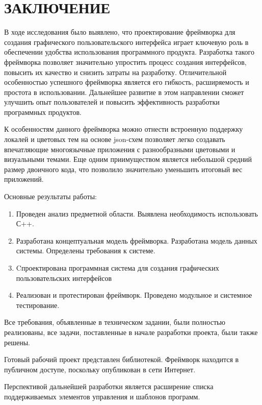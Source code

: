 \section*{ЗАКЛЮЧЕНИЕ}

В ходе исследования было выявлено, что проектирование фреймворка для создания графического пользовательского интерфейса играет ключевую роль в обеспечении удобства использования программного продукта. Разработка такого фреймворка позволяет значительно упростить процесс создания интерфейсов, повысить их качество и снизить затраты на разработку. Отличительной особенностью успешного фреймворка является его гибкость, расширяемость и простота в использовании. Дальнейшее развитие в этом направлении сможет улучшить опыт пользователей и повысить эффективность разработки программных продуктов.

К особенностям данного фреймворка можно отнести встроенную поддержку локалей и цветовых тем на основе json-схем позволяет легко создавать впечатляющие многоязычные приложения с разнообразными цветовыми и визуальными темами. Еще одним приимуществом является небольшой средний размер двоичного кода, что позволило значительно уменьшить итоговый вес приложений. 

Основные результаты работы:

\begin{enumerate}
\item Проведен анализ предметной области. Выявлена необходимость использовать С++.
\item Разработана концептуальная модель фреймворка. Разработана модель данных системы. Определены требования к системе.
\item Cпроектирована программная система для создания графических пользовательских интерфейсов
\item Реализован и протестирован фреймворк. Проведено модульное и системное тестирование.
\end{enumerate}

Все требования, объявленные в техническом задании, были полностью реализованы, все задачи, поставленные в начале разработки проекта, были также решены.

Готовый рабочий проект представлен библиотекой. Фреймворк находится в публичном доступе, поскольку опубликован в сети Интернет.

Перспективой дальнейшей разработки является расширение списка поддерживаемых элементов управления и шаблонов программ.

